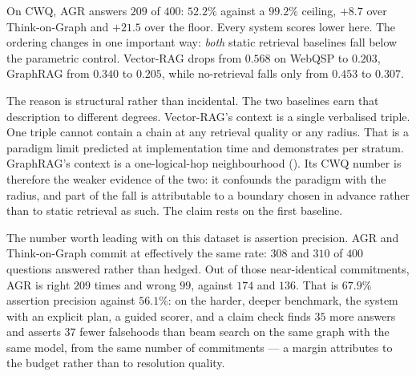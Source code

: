 On CWQ, AGR answers $209$ of $400$: $52.2\%$ against a $99.2\%$ ceiling,
$+8.7$ over Think-on-Graph and
$+21.5$ over the floor. Every system scores lower here. The ordering changes
in one important way: \emph{both} static retrieval baselines fall below the
parametric control. Vector-RAG drops from $0.568$ on WebQSP to $0.203$, GraphRAG
from $0.340$ to $0.205$, while no-retrieval falls only from $0.453$ to $0.307$.

The reason is structural rather than incidental. The two baselines earn that
description to different degrees. Vector-RAG's context is a single verbalised
triple. One triple cannot contain a chain at any retrieval quality or any
radius. That is a paradigm limit  predicted at
implementation time and  demonstrates per stratum.
GraphRAG's context is a one-logical-hop neighbourhood
(). Its CWQ number is therefore the weaker evidence
of the two: it confounds the paradigm with the radius, and part of the fall is
attributable to a boundary chosen in advance rather than to static retrieval as
such. The claim rests on the first baseline.

The number worth leading with on this dataset is assertion precision. AGR and
Think-on-Graph commit at effectively the same rate: $308$ and $310$ of $400$
questions answered rather than hedged. Out of those near-identical
commitments, AGR is right $209$ times and wrong $99$, against $174$ and $136$.
That is $67.9\%$ assertion precision against $56.1\%$: on the harder, deeper
benchmark, the system with an explicit plan, a guided scorer, and a claim check
finds $35$ more answers and asserts $37$ fewer falsehoods than beam search on
the same graph with the same model, from the same number of commitments --- a
margin  attributes to the budget rather than to resolution
quality.

